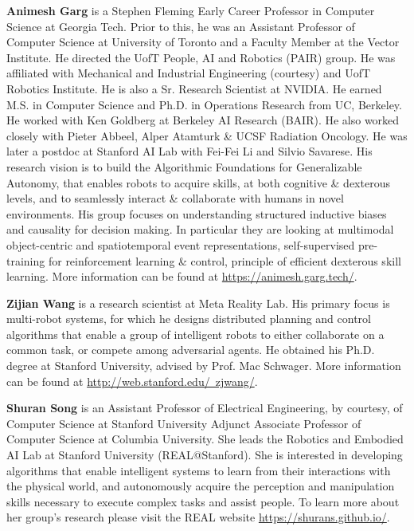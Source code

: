 \documentclass[10pt]{article} %
\begin{document}
\textbf{Animesh Garg} is a Stephen Fleming Early Career Professor in Computer Science at Georgia Tech. Prior to this, he was an Assistant Professor of Computer Science at University of Toronto and a Faculty Member at the Vector Institute. He directed the UofT People, AI and Robotics (PAIR) group. He was affiliated with Mechanical and Industrial Engineering (courtesy) and UofT Robotics Institute. He is also a Sr. Research Scientist at NVIDIA. He earned M.S. in Computer Science and Ph.D. in Operations Research from UC, Berkeley. He worked with Ken Goldberg at Berkeley AI Research (BAIR). He also worked closely with Pieter Abbeel, Alper Atamturk \& UCSF Radiation Oncology. He was later a postdoc at Stanford AI Lab with Fei-Fei Li and Silvio Savarese. His research vision is to build the Algorithmic Foundations for Generalizable Autonomy, that enables robots to acquire skills, at both cognitive \& dexterous levels, and to seamlessly interact \& collaborate with humans in novel environments. His group focuses on understanding structured inductive biases and causality for decision making. In particular they are looking at multimodal object-centric and spatiotemporal event representations, self-supervised pre-training for reinforcement learning \& control, principle of efficient dexterous skill learning. More information can be found at \href{https://animesh.garg.tech/}{https://animesh.garg.tech/}. 


\textbf{Zijian Wang} is a research scientist at Meta Reality Lab. His primary focus is multi-robot systems, for which he designs distributed planning and control algorithms that enable a group of intelligent robots to either collaborate on a common task, or compete among adversarial agents.  He obtained his Ph.D. degree at Stanford University, advised by Prof. Mac Schwager. More information can be found at \href{http://web.stanford.edu/~zjwang/}{http://web.stanford.edu/~zjwang/}. 


\textbf{Shuran Song} is an Assistant Professor of Electrical Engineering, by courtesy, of Computer Science at Stanford University Adjunct Associate Professor of Computer Science at Columbia University. She leads the Robotics and Embodied AI Lab at Stanford University (REAL@Stanford). She is interested in developing algorithms that enable intelligent systems to learn from their interactions with the physical world, and autonomously acquire the perception and manipulation skills necessary to execute complex tasks and assist people. To learn more about her group's research please visit the REAL website \href{https://shurans.github.io/}{https://shurans.github.io/}.
\end{document}
